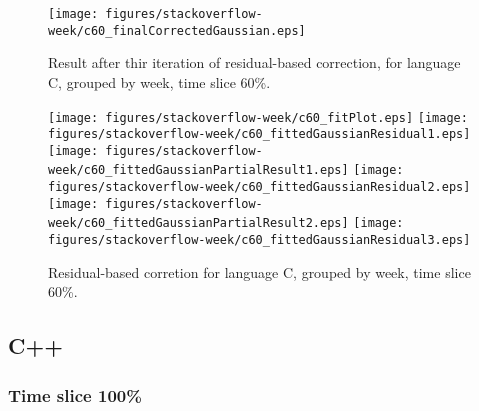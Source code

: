 \begin{figure}[]
\centering
{\texttt{[image: figures/stackoverflow-week/c60\_finalCorrectedGaussian.eps]}}
\caption{Result after thir iteration of residual-based correction, for language C, grouped by week, time slice 60\%.}
\end{figure}


\begin{figure}[hb]
\centering
{}
{\texttt{[image: figures/stackoverflow-week/c60\_fitPlot.eps]}}
{\texttt{[image: figures/stackoverflow-week/c60\_fittedGaussianResidual1.eps]}}
{\texttt{[image: figures/stackoverflow-week/c60\_fittedGaussianPartialResult1.eps]}}
{\texttt{[image: figures/stackoverflow-week/c60\_fittedGaussianResidual2.eps]}}
{\texttt{[image: figures/stackoverflow-week/c60\_fittedGaussianPartialResult2.eps]}}
{\texttt{[image: figures/stackoverflow-week/c60\_fittedGaussianResidual3.eps]}}
\caption{Residual-based corretion for language C, grouped by week, time slice 60\%.}
\end{figure}


\clearpage 
\newpage 


\subsection{C++}

\FloatBarrier

\subsubsection{Time slice 100\%}

